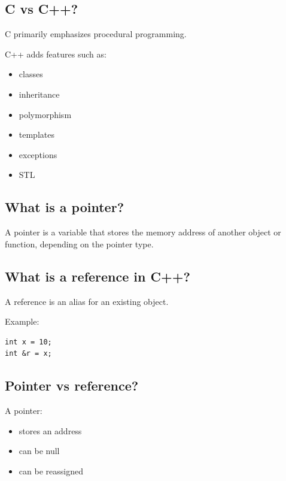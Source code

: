 \medskip

\subsection{C vs C++?}

C primarily emphasizes procedural programming.

C++ adds features such as:

\begin{itemize}
  \item classes
  \item inheritance
  \item polymorphism
  \item templates
  \item exceptions
  \item STL
\end{itemize}

\medskip

\subsection{What is a pointer?}

A pointer is a variable that stores the memory address of another object or function, depending on the pointer type.

\medskip

\subsection{What is a reference in C++?}

A reference is an alias for an existing object.

Example:

\begin{lstlisting}
int x = 10;
int &r = x;
\end{lstlisting}

\medskip

\subsection{Pointer vs reference?}

A pointer:

\begin{itemize}
  \item stores an address
  \item can be null
  \item can be reassigned
\end{itemize}

